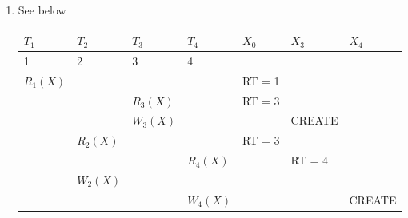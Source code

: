 \documentclass[10pt]{myland}
\begin{document}
\begin{enumerate}
		\item See below
            \begin{center}
                \begin{tabularx}{\linewidth}{Y|Y|Y|Y|Y|Y|Y}
                    $T_1$ & $T_2$ & $T_3$ & $T_4$ & $X_0$ & $X_3$ & $X_4$ \\  & 2 & 3 & 4 & & &  \\ \hline
					$R_1(X)$ & & & & RT = 1 & &  \\ \hline
					& & $R_3(X)$  & & RT = 3 & &  \\ \hline
					& & $W_3(X)$  & & & CREATE &  \\ \hline
					& $R_2(X)$ & & & RT = 3& &  \\ \hline
					& & & $R_4(X)$ & & RT = 4 &  \\ \hline
					&  & & & & &  \\ \hline
					& & & $W_4(X)$ & &  & CREATE  \\ \hline
                \end{tabularx}
            \end{center}
	\end{enumerate}
\end{document}

